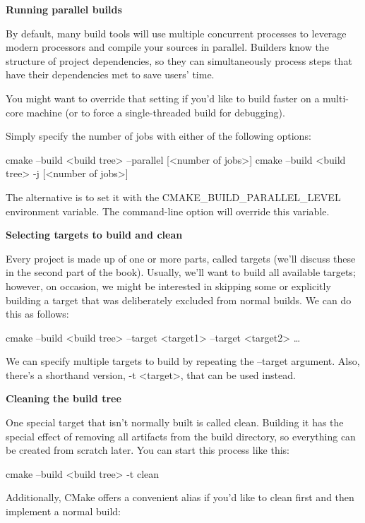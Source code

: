 \noindent
\textbf{Running parallel builds}

By default, many build tools will use multiple concurrent processes to leverage modern processors and compile your sources in parallel. Builders know the structure of project dependencies, so they can simultaneously process steps that have their dependencies met to save users’ time.

You might want to override that setting if you’d like to build faster on a multi-core machine (or to force a single-threaded build for debugging).

Simply specify the number of jobs with either of the following options:

\begin{shell}
cmake --build <build tree> --parallel [<number of jobs>]
cmake --build <build tree> -j [<number of jobs>]
\end{shell}

The alternative is to set it with the CMAKE\_BUILD\_PARALLEL\_LEVEL environment variable. The command-line option will override this variable.

\noindent
\textbf{Selecting targets to build and clean }

Every project is made up of one or more parts, called targets (we’ll discuss these in the second part of the book). Usually, we’ll want to build all available targets; however, on occasion, we might be interested in skipping some or explicitly building a target that was deliberately excluded from normal builds. We can do this as follows:

\begin{shell}
cmake --build <build tree> --target <target1> --target <target2> …
\end{shell}

We can specify multiple targets to build by repeating the –target argument. Also, there’s a shorthand version, -t <target>, that can be used instead.

\noindent
\textbf{Cleaning the build tree }

One special target that isn’t normally built is called clean. Building it has the special effect of removing all artifacts from the build directory, so everything can be created from scratch later.
You can start this process like this:

\begin{shell}
cmake --build <build tree> -t clean
\end{shell}

Additionally, CMake offers a convenient alias if you’d like to clean first and then implement a normal build:

